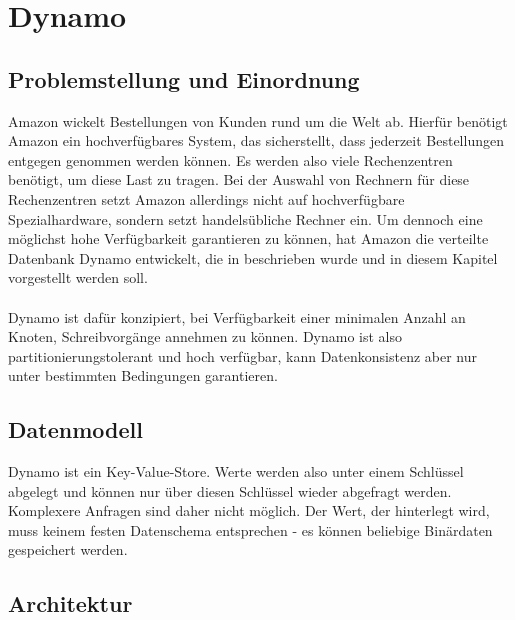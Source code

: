 \chapter{Dynamo}
\label{appendiceC}


\section{Problemstellung und Einordnung}
Amazon wickelt Bestellungen von Kunden rund um die Welt ab. Hierfür benötigt Amazon ein hochverfügbares System, das sicherstellt, dass jederzeit Bestellungen entgegen genommen werden können. Es werden also viele Rechenzentren benötigt, um diese Last zu tragen. Bei der Auswahl von Rechnern für diese Rechenzentren setzt Amazon allerdings nicht auf hochverfügbare Spezialhardware, sondern setzt handelsübliche Rechner ein. Um dennoch eine möglichst hohe Verfügbarkeit garantieren zu können, hat Amazon die verteilte Datenbank Dynamo entwickelt, die in \cite{dynamo} beschrieben wurde und in diesem Kapitel vorgestellt werden soll. \\ 
\\
Dynamo ist dafür konzipiert, bei Verfügbarkeit einer minimalen Anzahl an Knoten, Schreibvorgänge annehmen zu können. Dynamo ist also partitionierungstolerant und hoch verfügbar, kann Datenkonsistenz aber nur unter bestimmten Bedingungen garantieren. 
\section{Datenmodell}
Dynamo ist ein Key-Value-Store. Werte werden also unter einem Schlüssel abgelegt und können nur über diesen Schlüssel wieder abgefragt werden. Komplexere Anfragen sind daher nicht möglich. Der Wert, der hinterlegt wird, muss keinem festen Datenschema entsprechen - es können beliebige Binärdaten gespeichert werden.

\section{Architektur}

